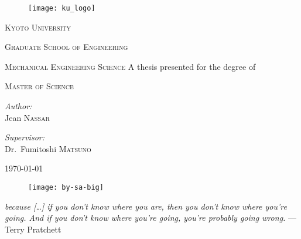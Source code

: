 \begin{titlepage}
  \begin{center}
    \noindent

    \begin{figure}[h]
      \centering
      \texttt{[image: ku\_logo]}
    \end{figure}
    \textsc{\LARGE Kyoto University}
    
    \textsc{\Large Graduate School of Engineering}

    \textsc{\large Mechanical Engineering Science}
    \vfill\vfill
    \textsc{\large \mytitle}  %
    \vfill\vfill
    {\large A thesis presented for the degree of}

    \textsc{\large Master of Science}
    \vfill\vfill
    \begin{minipage}[t]{0.4\textwidth}
      \begin{flushleft}
	\emph{Author:}\\
	Jean \textsc{Nassar}
      \end{flushleft}
    \end{minipage}
    \begin{minipage}[t]{0.4\textwidth}
      \begin{flushright}
	\emph{Supervisor:}\\
	Dr.~Fumitoshi \textsc{Matsuno}
      \end{flushright}
    \end{minipage}
    \vfill
    \today
    \begin{figure}[h]
      \centering
      \texttt{[image: by-sa-big]}
    \end{figure}
  \end{center}
\end{titlepage}

\thispagestyle{empty}
  \null{}
    \begin{flushright}
      \emph{
	because [\ldots] if you don't know where you are, then you don't know where you're going.
	And if you don't know where you're going, you're probably going wrong.
      } --- Terry Pratchett
    \end{flushright}
  \null

